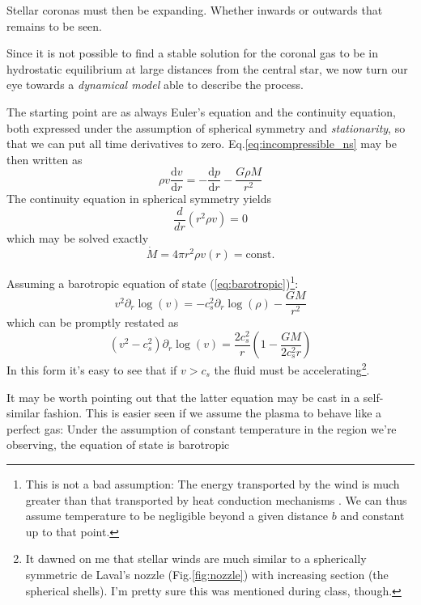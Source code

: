 \par Stellar coronas must then be expanding. Whether inwards or outwards that remains to be seen.
\par Since it is not possible to find a stable solution for the coronal gas to be in hydrostatic equilibrium at large distances from the central star, we now turn our eye towards a \emph{dynamical model} able to describe the process.
\par The starting point are as always Euler's equation and the continuity equation, both expressed under the assumption of spherical symmetry and \emph{stationarity}, so that we can put all time derivatives to zero. Eq.\ref{eq:incompressible_ns} may be then written as
\begin{equation}
    \rho v\frac{\text{d}v}{\text{d}r} = -\frac{\text{d}p}{\text{d}r}-\frac{G\rho M}{r^{2}}
    \label{eq:eusph}
\end{equation}
The continuity equation in spherical symmetry yields
\begin{equation}
    \frac{d}{dr}(r^{2}\rho v) = 0
    \label{eq:cont}
\end{equation}
which may be solved exactly
\begin{equation}
    \dot{M} = 4\pi r^{2}\rho v(r) = \text{const.}
\end{equation}
\par Assuming a barotropic equation of state (\ref{eq:barotropic})\footnote{This is not a bad assumption: The energy transported by the wind is much greater than that transported by heat conduction mechanisms \cite{1953sun..book..207V}. We can thus assume temperature to be negligible beyond a given distance $b$ and constant up to that point.}: 
\begin{equation*}
    v^{2}\partial_{r}\log(v) = -c_{s}^{2}\partial_{r}\log(\rho)-\frac{GM}{r^{2}}
\end{equation*}
which can be promptly restated as 
\begin{equation*}
    (v^{2}-c_{s}^{2})\partial_{r}\log(v) = \frac{2c_{s}^{2}}{r}\left(1-\frac{GM}{2c_{s}^{2}r}\right)
\end{equation*}
In this form it's easy to see that if $v>c_{s}$ the fluid must be accelerating\footnote{It dawned on me that stellar winds are much similar to a spherically symmetric de Laval's nozzle (Fig.\ref{fig:nozzle}) with increasing section (the spherical shells). I'm pretty sure this was mentioned during class, though.}.
\par It may be worth pointing out that the latter equation may be cast in a self-similar fashion. This is easier seen if we assume the plasma to behave like a perfect gas: Under the assumption of constant temperature in the region we're observing, the equation of state is barotropic
